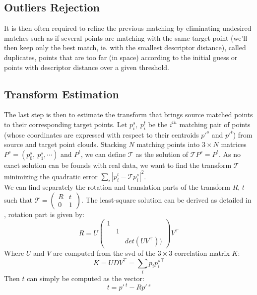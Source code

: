 \subsection{Outliers Rejection} 

    It is then often required to refine the previous matching by eliminating undesired matches such as if several points are matching with the same target point (we'll then keep only the best match, ie. with the smallest descriptor distance), called duplicates, points that are too far (in space) according to the initial guess or points with descriptor distance over a given threshold.
    
\subsection{Transform Estimation} \label{subsec:transf_est}
    
    The last step is then to estimate the transform that brings source matched points to their corresponding target points. Let $p_i^s, \:p_i^t$ be the $i^{th}$ matching pair of points (whose coordinates are expressed with respect to their centroids $p'^s$ and $p'^t$) from source and target point clouds. Stacking $N$ matching points into $3\times N$ matrices $P^s = \left ( p_0^s,\:p_1^s, \cdots  \right )$ and $P^t$, we can define $\mathcal{T}$ as the solution of $\mathcal{T}P^s = P^t$. As no exact solution can be founds with real data, we want to find the transform $\mathcal{T}$ minimizing the quadratic error $\sum_i\left | p_i^t - \mathcal{T}p_i^s \right |^2$. \\
    We can find separately the rotation and translation parts of the transform $R$, $t$ such that 
    $\mathcal{T}=\begin{pmatrix}
    R & t\\ 
    0 & 1
    \end{pmatrix}$.
    The least-square solution can be derived as detailed in \cite{sork2017}, rotation part is given by: 
    \[
    R=U\begin{pmatrix}
    1 &  & \\ 
     & 1 & \\ 
     &  & det(UV^\top))
    \end{pmatrix}V^\top
    \]
    Where $U$ and $V$ are computed from the \acrshort{svd} of the $3\times 3$ correlation matrix $K$:
    \[
    K=UDV^\top=\sum_i p_i {p_i^s}^\top
    \]
    Then $t$ can simply be computed as the vector: 
    \[
        t=p'\,^t-Rp'\,^s
    \]

